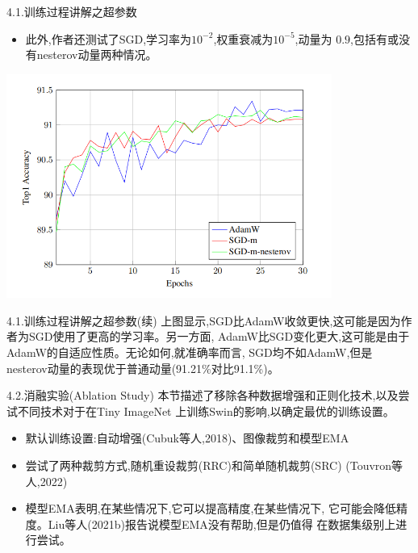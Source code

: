 \documentclass[UTF8]{ctexbeamer}
\begin{document}
\begin{frame}{4.1.训练过程讲解之超参数}
  \begin{itemize}
    \item 此外,作者还测试了SGD,学习率为$10^{-2}$,权重衰减为$10^{-5}$,动量为
    $0.9$,包括有或没有nesterov动量两种情况。
  \end{itemize}
  \begin{center}
    \includegraphics[width=0.8\textwidth]{1.png}
  \end{center}
\end{frame}

\begin{frame}{4.1.训练过程讲解之超参数(续)}
  上图显示,SGD比AdamW收敛更快,这可能是因为作者为SGD使用了更高的学习率。另一方面,
  AdamW比SGD变化更大,这可能是由于AdamW的自适应性质。无论如何,就准确率而言,
  SGD均不如AdamW,但是nesterov动量的表现优于普通动量(91.21\%对比91.1\%)。
\end{frame}

\begin{frame}{4.2.消融实验(Ablation Study)}
  本节描述了移除各种数据增强和正则化技术,以及尝试不同技术对于在Tiny ImageNet
  上训练Swin的影响,以确定最优的训练设置。

  \begin{itemize}
    \item 默认训练设置:自动增强(Cubuk等人,2018)、图像裁剪和模型EMA
    \item 尝试了两种裁剪方式,随机重设裁剪(RRC)和简单随机裁剪(SRC)
    (Touvron等人,2022)
    \item 模型EMA表明,在某些情况下,它可以提高精度,在某些情况下,
    它可能会降低精度。Liu等人(2021b)报告说模型EMA没有帮助,但是仍值得
    在数据集级别上进行尝试。
  \end{itemize}
\end{frame}
\end{document}
